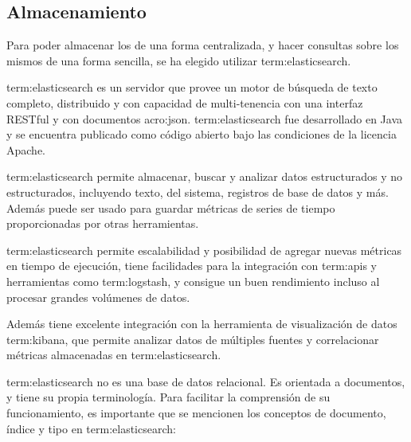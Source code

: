 \subsection{Almacenamiento}
\label{almacenamiento}

Para poder almacenar los  de una forma centralizada, y hacer consultas
sobre los mismos de una forma sencilla, se ha elegido utilizar
\gls{term:elasticsearch}.

\gls{term:elasticsearch} es un servidor que provee un motor de búsqueda de
texto completo, distribuido y con capacidad de multi-tenencia con una interfaz
 RESTful y con documentos \gls{acro:json}. \gls{term:elasticsearch}
fue desarrollado en Java y se encuentra publicado como código abierto bajo las
condiciones de la licencia Apache.

\gls{term:elasticsearch} permite almacenar, buscar y analizar datos
estructurados y no estructurados, incluyendo texto,  del sistema,
registros de base de datos y más. Además puede ser usado para guardar métricas
de series de tiempo proporcionadas por otras herramientas.

\gls{term:elasticsearch} permite escalabilidad y posibilidad de agregar nuevas
métricas en tiempo de ejecución, tiene facilidades para la integración con
\glspl{term:api} y herramientas como \gls{term:logstash}, y consigue un buen
rendimiento incluso al procesar grandes volúmenes de datos.

Además tiene excelente integración con la herramienta de visualización de datos
\gls{term:kibana}, que permite analizar datos de múltiples fuentes y
correlacionar métricas almacenadas en \gls{term:elasticsearch}.

\gls{term:elasticsearch} no es una base de datos relacional. Es orientada a
documentos, y tiene su propia terminología. Para facilitar la comprensión de su
funcionamiento, es importante que se mencionen los conceptos de documento,
índice y tipo en \gls{term:elasticsearch}:

